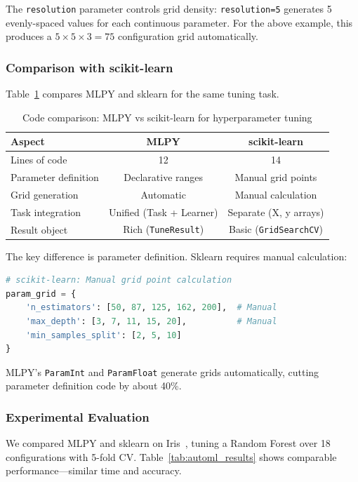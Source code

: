 The \texttt{resolution} parameter controls grid density: \texttt{resolution=5} generates 5 evenly-spaced values for each continuous parameter. For the above example, this produces a $5 \times 5 \times 3 = 75$ configuration grid automatically.

\subsubsection{Comparison with scikit-learn}

Table~\ref{tab:automl_code_comparison} compares MLPY and sklearn for the same
tuning task.

\begin{table}[ht]
\centering
\caption{Code comparison: MLPY vs scikit-learn for hyperparameter tuning}
\label{tab:automl_code_comparison}
\begin{tabular}{lcc}
\toprule
\textbf{Aspect} & \textbf{MLPY} & \textbf{scikit-learn} \\
\midrule
Lines of code & 12 & 14 \\
Parameter definition & Declarative ranges & Manual grid points \\
Grid generation & Automatic & Manual calculation \\
Task integration & Unified (Task + Learner) & Separate (X, y arrays) \\
Result object & Rich (\texttt{TuneResult}) & Basic (\texttt{GridSearchCV}) \\
\bottomrule
\end{tabular}
\end{table}

The key difference is parameter definition. Sklearn requires manual calculation:

\begin{lstlisting}[language=Python]
# scikit-learn: Manual grid point calculation
param_grid = {
    'n_estimators': [50, 87, 125, 162, 200],  # Manual
    'max_depth': [3, 7, 11, 15, 20],          # Manual
    'min_samples_split': [2, 5, 10]
}
\end{lstlisting}

MLPY's \texttt{ParamInt} and \texttt{ParamFloat} generate grids automatically,
cutting parameter definition code by about 40\%.

\subsubsection{Experimental Evaluation}

We compared MLPY and sklearn on Iris~\citep{fisher1936use}, tuning a Random
Forest over 18 configurations with 5-fold CV. Table~\ref{tab:automl_results}
shows comparable performance---similar time and accuracy.


